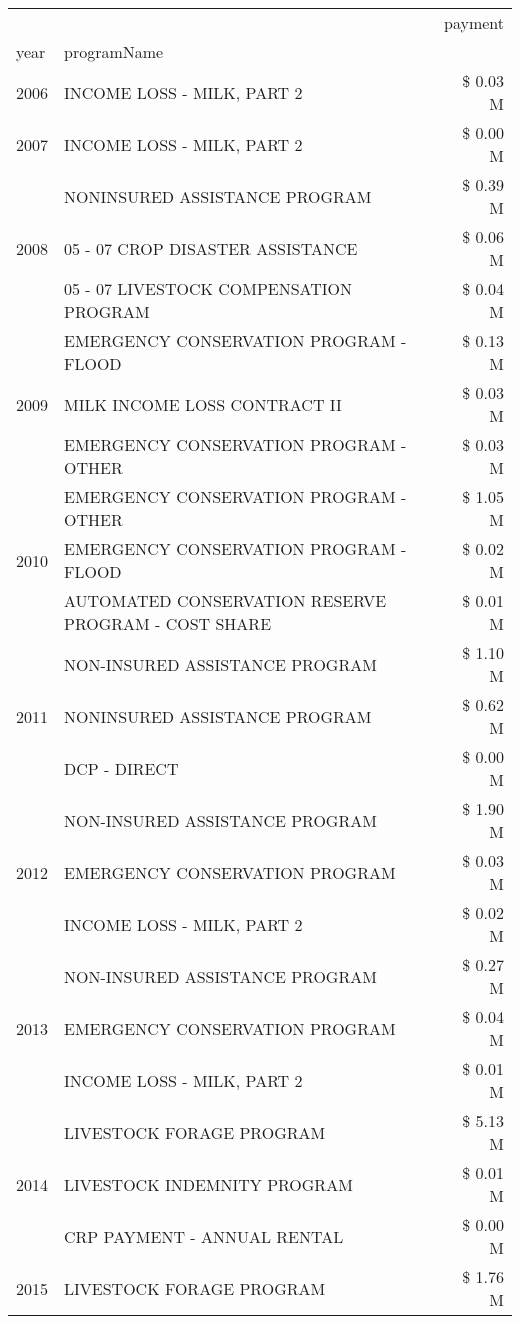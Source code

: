 \begin{tabular}{llr}
\toprule
 &  & payment \\
year & programName &  \\
\midrule
2006 & INCOME LOSS - MILK, PART 2 & \$ 0.03 M \\
\cline{1-3}
2007 & INCOME LOSS - MILK, PART 2 & \$ 0.00 M \\
\cline{1-3}
\multirow[t]{3}{*}{2008} & NONINSURED ASSISTANCE PROGRAM & \$ 0.39 M \\
 & 05 - 07 CROP DISASTER ASSISTANCE & \$ 0.06 M \\
 & 05 - 07 LIVESTOCK COMPENSATION PROGRAM & \$ 0.04 M \\
\cline{1-3}
\multirow[t]{3}{*}{2009} & EMERGENCY CONSERVATION PROGRAM - FLOOD & \$ 0.13 M \\
 & MILK INCOME LOSS CONTRACT II & \$ 0.03 M \\
 & EMERGENCY CONSERVATION PROGRAM - OTHER & \$ 0.03 M \\
\cline{1-3}
\multirow[t]{3}{*}{2010} & EMERGENCY CONSERVATION PROGRAM - OTHER & \$ 1.05 M \\
 & EMERGENCY CONSERVATION PROGRAM - FLOOD & \$ 0.02 M \\
 & AUTOMATED CONSERVATION RESERVE PROGRAM - COST SHARE & \$ 0.01 M \\
\cline{1-3}
\multirow[t]{3}{*}{2011} & NON-INSURED ASSISTANCE PROGRAM & \$ 1.10 M \\
 & NONINSURED ASSISTANCE PROGRAM & \$ 0.62 M \\
 & DCP - DIRECT & \$ 0.00 M \\
\cline{1-3}
\multirow[t]{3}{*}{2012} & NON-INSURED ASSISTANCE PROGRAM & \$ 1.90 M \\
 & EMERGENCY CONSERVATION PROGRAM & \$ 0.03 M \\
 & INCOME LOSS - MILK, PART 2 & \$ 0.02 M \\
\cline{1-3}
\multirow[t]{3}{*}{2013} & NON-INSURED ASSISTANCE PROGRAM & \$ 0.27 M \\
 & EMERGENCY CONSERVATION PROGRAM & \$ 0.04 M \\
 & INCOME LOSS - MILK, PART 2 & \$ 0.01 M \\
\cline{1-3}
\multirow[t]{3}{*}{2014} & LIVESTOCK FORAGE PROGRAM & \$ 5.13 M \\
 & LIVESTOCK INDEMNITY PROGRAM & \$ 0.01 M \\
 & CRP PAYMENT - ANNUAL RENTAL & \$ 0.00 M \\
\cline{1-3}
\multirow[t]{3}{*}{2015} & LIVESTOCK FORAGE PROGRAM & \$ 1.76 M \\

\end{tabular}
